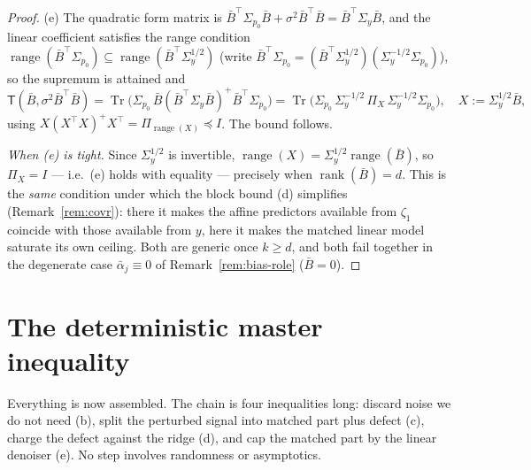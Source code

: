 \documentclass[11pt]{article}
\theoremstyle{remark}
\newcommand{\Tr}{\operatorname{Tr}}
\newcommand{\Sig}{\Sigma_{p_0}}
\newcommand{\Sy}{\Sigma_y}
\newcommand{\TT}{\mathsf{T}}
\begin{document}
\begin{proof}
(e) The quadratic form matrix is $\bar B^\top\Sig\bar B + \sigma^2\bar B^\top\bar B = \bar B^\top\Sy\bar B$, and the linear coefficient satisfies the range condition $\operatorname{range}(\bar B^\top\Sig) \subseteq \operatorname{range}(\bar B^\top\Sy^{1/2})$ (write $\bar B^\top\Sig = (\bar B^\top\Sy^{1/2})(\Sy^{-1/2}\Sig)$), so the supremum is attained and
\[
\TT(\bar B, \sigma^2\bar B^\top\bar B) = \Tr\big(\Sig\,\bar B(\bar B^\top\Sy\bar B)^{+}\bar B^\top\Sig\big)
= \Tr\big(\Sig\,\Sy^{-1/2}\,\Pi_X\,\Sy^{-1/2}\Sig\big), \quad X := \Sy^{1/2}\bar B,
\]
using $X(X^\top X)^+X^\top = \Pi_{\operatorname{range}(X)} \preceq I$. The bound follows.

\emph{When (e) is tight.} Since $\Sy^{1/2}$ is invertible, $\operatorname{range}(X) = \Sy^{1/2}\operatorname{range}(\bar B)$, so $\Pi_X = I$ --- i.e.\ (e) holds with equality --- precisely when $\operatorname{rank}(\bar B) = d$. This is the \emph{same} condition under which the block bound (d) simplifies (Remark~\ref{rem:covr}): there it makes the affine predictors available from $\zeta_1$ coincide with those available from $y$, here it makes the matched linear model saturate its own ceiling. Both are generic once $k \ge d$, and both fail together in the degenerate case $\bar\alpha_j \equiv 0$ of Remark~\ref{rem:bias-role} ($\bar B = 0$).
\end{proof}

\section{The deterministic master inequality}\label{sec:master}

Everything is now assembled. The chain is four inequalities long: discard noise we do not need (b), split the perturbed signal into matched part plus defect (c), charge the defect against the ridge (d), and cap the matched part by the linear denoiser (e). No step involves randomness or asymptotics.
\end{document}
